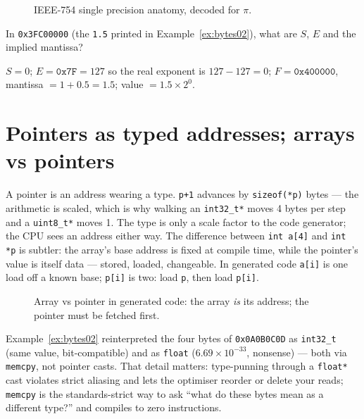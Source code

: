 \begin{figure}[htbp]
\centering

\caption{IEEE-754 single precision anatomy, decoded for $\pi$.}
\label{fig:ieee02}
\end{figure}

\begin{checkpoint}
In \texttt{0x3FC00000} (the \texttt{1.5} printed in
Example~\ref{ex:bytes02}), what are $S$, $E$ and the implied mantissa?
\end{checkpoint}
\begin{solution}
$S{=}0$; $E{=}\texttt{0x7F}{=}127$ so the real exponent is $127-127=0$;
$F{=}\texttt{0x400000}$, mantissa $=1 + 0.5 = 1.5$; value
$= 1.5 \times 2^0$.
\end{solution}

\section{Pointers as typed addresses; arrays vs pointers}
\label{sec:ptr02}

A pointer is an address wearing a type. \texttt{p+1} advances by
\texttt{sizeof(*p)} bytes --- the arithmetic is scaled, which is why
walking an \texttt{int32\_t*} moves 4 bytes per step and a
\texttt{uint8\_t*} moves 1. The type is only a scale factor to the
code generator; the CPU sees an address either way. The difference
between \texttt{int a[4]} and \texttt{int *p} is subtler: the array's
base address is fixed at compile time, while the pointer's value is
itself data --- stored, loaded, changeable. In generated code
\texttt{a[i]} is one load off a known base; \texttt{p[i]} is two: load
\texttt{p}, then load \texttt{p[i]}.

\begin{figure}[htbp]
\centering

\caption{Array vs pointer in generated code: the array \emph{is} its
address; the pointer must be fetched first.}
\label{fig:ptrarr02}
\end{figure}

\begin{example}
\label{ex:pun02}
Example~\ref{ex:bytes02} reinterpreted the four bytes of
\texttt{0x0A0B0C0D} as \texttt{int32\_t} (same value, bit-compatible)
and as \texttt{float} ($6.69 \times 10^{-33}$, nonsense) --- both via
\texttt{memcpy}, not pointer casts. That detail matters: type-punning through a
\texttt{float*} cast violates strict aliasing and lets the optimiser
reorder or delete your reads; \texttt{memcpy} is the standards-strict
way to ask ``what do these bytes mean as a different type?'' and
compiles to zero instructions.
\end{example}

